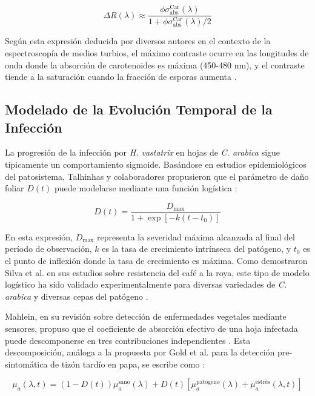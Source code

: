 \documentclass[12pt, a4paper]{article}
\begin{document}
	\begin{equation}
		\Delta R(\lambda) \approx \frac{\phi \sigma_{\text{abs}}^{\text{Car}}(\lambda)}{1 + \phi \sigma_{\text{abs}}^{\text{Car}}(\lambda) / 2}
		\label{eq:delta_r_final}
	\end{equation}
	
	Según esta expresión deducida por diversos autores en el contexto de la espectroscopía de medios turbios, el máximo contraste ocurre en las longitudes de onda donde la absorción de carotenoides es máxima (450-480 nm), y el contraste tiende a la saturación cuando la fracción de esporas aumenta \parencite{Zonios2006, Mourant1997}.
	
	\subsection{Modelado de la Evolución Temporal de la Infección}
	
	La progresión de la infección por \textit{H. vastatrix} en hojas de \textit{C. arabica} sigue típicamente un comportamiento sigmoide. Basándose en estudios epidemiológicos del patosistema, Talhinhas y colaboradores propusieron que el parámetro de daño foliar $D(t)$ puede modelarse mediante una función logística \parencite{Talhinhas2017}:
	
	\begin{equation}
		D(t) = \frac{D_{\max}}{1 + \exp[-k(t - t_0)]}
		\label{eq:logistica_dano}
	\end{equation}
	
	En esta expresión, $D_{\max}$ representa la severidad máxima alcanzada al final del período de observación, $k$ es la tasa de crecimiento intrínseca del patógeno, y $t_0$ es el punto de inflexión donde la tasa de crecimiento es máxima. Como demostraron Silva et al. en sus estudios sobre resistencia del café a la roya, este tipo de modelo logístico ha sido validado experimentalmente para diversas variedades de \textit{C. arabica} y diversas cepas del patógeno \parencite{Silva2006}.
	
	Mahlein, en su revisión sobre detección de enfermedades vegetales mediante sensores, propuso que el coeficiente de absorción efectivo de una hoja infectada puede descomponerse en tres contribuciones independientes \parencite{Mahlein2016}. Esta descomposición, análoga a la propuesta por Gold et al. para la detección pre-sintomática de tizón tardío en papa, se escribe como \parencite{Gold2020}:
	
	\begin{equation}
		\mu_a(\lambda, t) = (1 - D(t)) \mu_a^{\text{sano}}(\lambda) + D(t) \left[ \mu_a^{\text{patógeno}}(\lambda) + \mu_a^{\text{estrés}}(\lambda, t) \right]
		\label{eq:mu_a_temporal}
	\end{equation}
	
\end{document}
